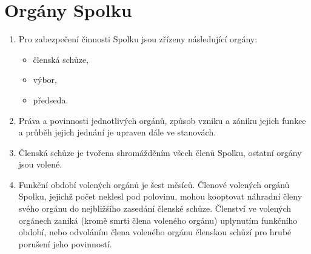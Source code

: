\documentclass[11pt,a4paper]{article}
\begin{document}
\section{Orgány Spolku}
\begin{enumerate}[itemsep=0pt]
    \item  Pro zabezpečení činnosti Spolku jsou zřízeny následující orgány: 
    \begin{itemize}[itemsep=0pt,topsep=0pt]
        \item členská schůze,
        \item výbor,
        \item předseda.
    \end{itemize}
    \item Práva a povinnosti jednotlivých orgánů, způsob vzniku a zániku jejich 
    funkce a průběh jejich jednání je upraven dále ve stanovách.
    \item Členská schůze je tvořena shromážděním všech členů Spolku, ostatní 
    orgány jsou volené.
    \item Funkční období volených orgánů je šest měsíců. Členové volených 
    orgánů Spolku, jejichž počet neklesl pod polovinu, mohou kooptovat náhradní 
    členy svého orgánu do nejbližšího zasedání členské schůze. Členství 
    ve volených orgánech zaniká (kromě smrti člena voleného orgánu) uplynutím 
    funkčního období, nebo odvoláním člena voleného orgánu členskou schůzí 
    pro hrubé porušení jeho povinností.
\end{enumerate}
\end{document}

